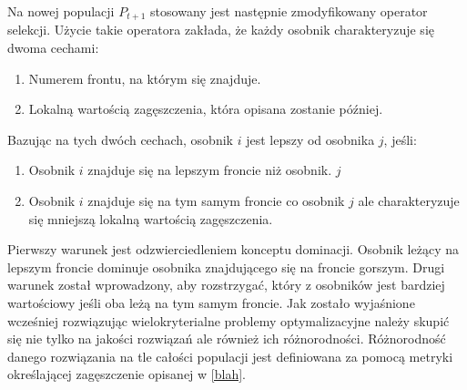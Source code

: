\documentclass[twoside]{iisthesis}
\begin{document}
Na nowej populacji $P_{t+1}$ stosowany jest następnie zmodyfikowany operator selekcji. Użycie takie operatora zakłada, że każdy osobnik charakteryzuje się dwoma cechami:\\
\begin{enumerate}
	\item Numerem frontu, na którym się znajduje.
	\item Lokalną wartością zagęszczenia, która opisana zostanie później.\\
\end{enumerate}
Bazując na tych dwóch cechach, osobnik $i$ jest lepszy od osobnika $j$, jeśli:\\
\begin{enumerate}
	\item Osobnik $i$ znajduje się na lepszym froncie niż osobnik. $j$
	\item Osobnik $i$ znajduje się na tym samym froncie co osobnik $j$ ale charakteryzuje się mniejszą lokalną wartością zagęszczenia.\\
\end{enumerate}
Pierwszy warunek jest odzwierciedleniem konceptu dominacji. Osobnik leżący na lepszym froncie dominuje osobnika znajdującego się na froncie gorszym. Drugi warunek został wprowadzony, aby rozstrzygać, który z osobników jest bardziej wartościowy jeśli oba leżą na tym samym froncie. Jak zostało wyjaśnione wcześniej rozwiązując wielokryterialne problemy optymalizacyjne należy skupić się nie tylko na jakości rozwiązań ale również ich różnorodności. Różnorodność danego rozwiązania na tle całości populacji jest definiowana za pomocą metryki określającej zagęszczenie opisanej w \ref{blah}. 
\end{document}
